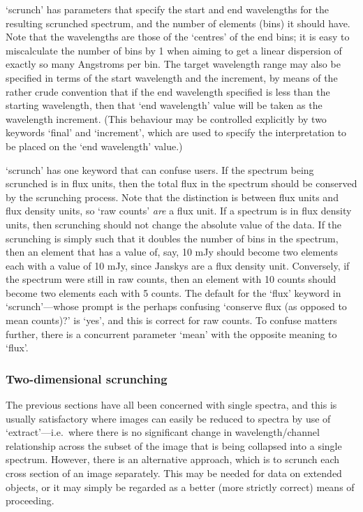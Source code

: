 \documentclass[11pt,twoside]{article}
\newcommand{\latorhtm}[2]{#1}
\newcommand{\latorhtm}[2]{#2}
\begin{document}
   `scrunch' has parameters that specify the start and end wavelengths
   for the resulting scrunched spectrum, and the number of elements
   (bins) it should have.  Note that the wavelengths are those of the
   `centres' of the end bins; it is easy to miscalculate the number of
   bins by 1 when aiming to get a linear dispersion of exactly so many
   Angstroms per bin.  The target wavelength range may also be specified
   in terms of the start wavelength and the increment, by means of the
   rather crude convention that if the end wavelength specified is less
   than the starting wavelength, then that `end wavelength' value will
   be taken as the wavelength increment.  (This behaviour may be
   controlled explicitly by two keywords `final' and `increment', which
   are used to specify the interpretation to be placed on the `end
   wavelength' value.)

   `scrunch' has one keyword that can confuse users.  If the spectrum
   being scrunched is in flux units, then the total flux in the spectrum
   should be conserved by the scrunching process.  Note that the
   distinction is between flux units and flux density units, so `raw
   counts' {\em are\/}
   a flux unit. If a spectrum is in flux density units, then scrunching
   should not change the absolute value of the data.  If the scrunching
   is simply such that it doubles the number of bins in the spectrum,
   then an element that has a value of, say, 10 mJy should become two
   elements each with a value of 10 mJy, since Janskys are a flux
   density unit.  Conversely, if the spectrum were still in raw counts,
   then an element with 10 counts should become two elements each with 5
   counts.  The default for the `flux' keyword in
   `scrunch'\latorhtm{---}{-}whose
   prompt is the perhaps confusing `conserve flux (as opposed to mean
   counts)?' is `yes', and this is correct for raw counts. To confuse
   matters further, there is a concurrent parameter `mean' with the
   opposite meaning to `flux'.


\subsubsection{\label{techno8iscrunch}Two-dimensional scrunching}

   The previous sections have all been concerned with single spectra,
   and this is usually satisfactory where images can easily be reduced
   to spectra by use of `extract'\latorhtm{---}{-}i.e.\ where there is
   no significant
   change in wavelength/channel relationship across the subset of the
   image that is being collapsed into a single spectrum. However, there
   is an alternative approach, which is to scrunch each cross section of
   an image separately.  This may be needed for data on extended
   objects, or it may simply be regarded as a better (more strictly
   correct) means of proceeding.
\end{document}
